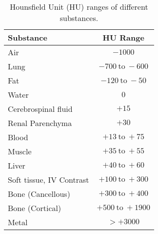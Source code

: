 \begin{table}[h!]
    \centering
    \begin{tabular}{|l|c|}
    \hline
    \textbf{Substance} & \textbf{HU Range} \\ \hline
    Air & $-1000$ \\ \hline
    Lung & $-700 \ \text{to} \ -600$ \\ \hline
    Fat & $-120 \ \text{to} \ -50$ \\ \hline
    Water & $0$ \\ \hline
    Cerebrospinal fluid & $+15$ \\ \hline
    Renal Parenchyma & $+30$ \\ \hline
    Blood & $+13 \ \text{to} \ +75$ \\ \hline
    Muscle & $+35 \ \text{to} \ +55$ \\ \hline
    Liver & $+40 \ \text{to} \ +60$ \\ \hline
    Soft tissue, IV Contrast & $+100 \ \text{to} \ +300$ \\ \hline
    Bone (Cancellous) & $+300 \ \text{to} \ +400$ \\ \hline
    Bone (Cortical) & $+500 \ \text{to} \ +1900$ \\ \hline
    Metal & $>+3000$ \\ \hline
    \end{tabular}
    \caption{Hounsfield Unit (HU) ranges of different substances.}
    \label{tab:hu-scale}
\end{table}
